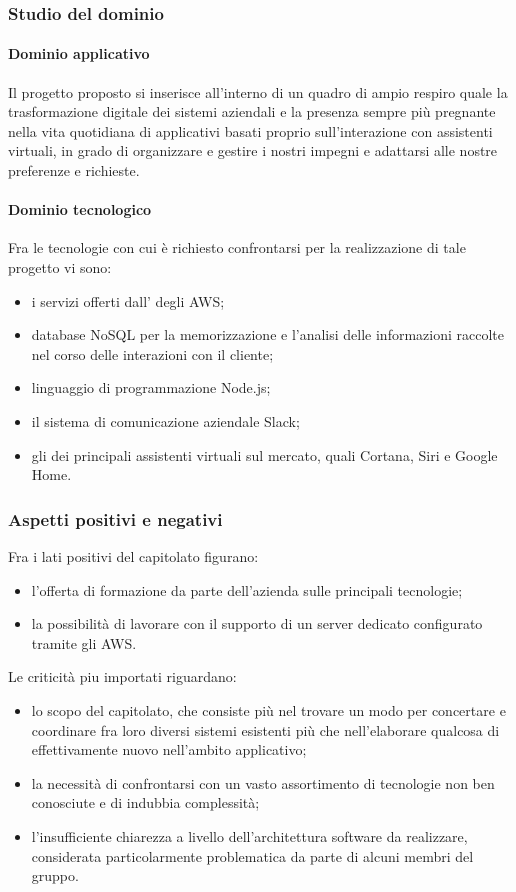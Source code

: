 		\subsubsection{Studio del dominio}
			\paragraph{Dominio applicativo}
			Il progetto proposto si inserisce all'interno di un quadro di ampio respiro quale la trasformazione digitale dei sistemi aziendali e la presenza sempre più pregnante nella vita quotidiana di applicativi basati proprio sull'interazione con assistenti virtuali, in grado di organizzare e gestire i nostri impegni e adattarsi alle nostre preferenze e richieste.
			
			\paragraph{Dominio tecnologico}
			Fra le tecnologie con cui è richiesto confrontarsi per la realizzazione di tale progetto vi sono:
			\begin{itemize}
				\item i servizi offerti dall' degli AWS;
				\item database NoSQL per la memorizzazione e l'analisi delle informazioni raccolte nel corso delle interazioni con il cliente;
				\item linguaggio di programmazione Node.js;
				\item il sistema di comunicazione aziendale Slack;
				\item gli  dei principali assistenti virtuali sul mercato, quali Cortana, Siri e Google Home.
			\end{itemize}
		\subsubsection{Aspetti positivi e negativi}
		Fra i lati positivi del capitolato figurano:
		\begin{itemize}
			\item l'offerta di formazione da parte dell'azienda sulle principali tecnologie;
			\item la possibilità di lavorare con il supporto di un server dedicato configurato tramite gli AWS.
		\end{itemize}
		Le criticità piu importati riguardano:
		\begin{itemize}
			\item lo scopo del capitolato, che consiste più nel trovare un modo per concertare e coordinare fra loro diversi sistemi 
			esistenti più che nell'elaborare qualcosa di effettivamente nuovo nell'ambito applicativo;
			\item la necessità di confrontarsi con un vasto assortimento di tecnologie non ben conosciute e di indubbia complessità;
			\item l'insufficiente chiarezza a livello dell'architettura software da realizzare, considerata particolarmente problematica da 
			parte di alcuni membri del gruppo.
		\end{itemize}
